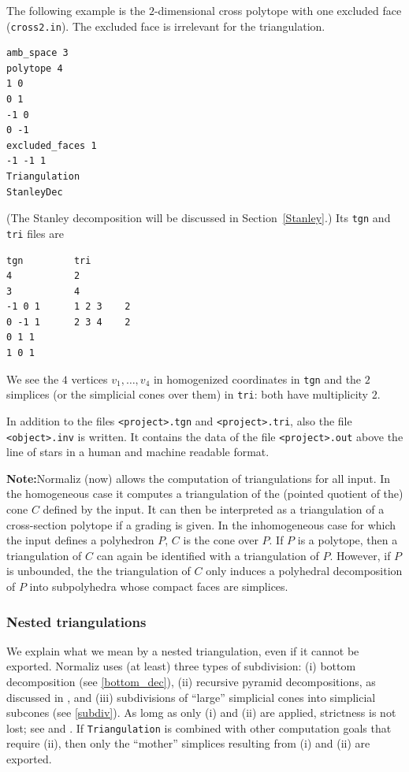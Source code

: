 The following example is the $2$-dimensional cross polytope with one excluded face (\verb|cross2.in|). The excluded face is irrelevant for the triangulation.

\begin{Verbatim}
amb_space 3
polytope 4
1 0
0 1
-1 0
0 -1
excluded_faces 1
-1 -1 1
Triangulation
StanleyDec        
\end{Verbatim}
(The Stanley decomposition will be discussed in Section~\ref{Stanley}.)
Its \verb|tgn| and \verb|tri| files are
\begin{Verbatim}
tgn         tri
4           2
3           4
-1 0 1      1 2 3    2
0 -1 1      2 3 4    2
0 1 1       
1 0 1 
\end{Verbatim}

We see the $4$ vertices $v_1,\dots,v_4$ in homogenized coordinates in \verb|tgn| and the $2$ simplices (or the simplicial cones over them) in \verb|tri|: both have multiplicity $2$.


In addition to the files \verb|<project>.tgn| and \verb|<project>.tri|, also the file \verb|<object>.inv| is written. It contains the data of the file \verb|<project>.out| above the line of stars in a human and machine readable format.

\textbf{Note:}\enspace Normaliz (now) allows the computation of triangulations for all input. In the homogeneous case it computes a triangulation of the (pointed quotient of the) cone $C$ defined by the input. It can then be interpreted as a triangulation of a cross-section polytope if a grading is given. In the inhomogeneous case for which the input defines a polyhedron $P$, $C$ is the cone over $P$. If $P$ is a polytope, then a triangulation of $C$ can again be identified with a triangulation of $P$. However, if $P$ is unbounded, the the triangulation of $C$ only induces a polyhedral decomposition of $P$ into subpolyhedra whose compact faces are simplices.

\subsubsection{Nested triangulations}\label{nested}
We explain what we mean by a nested triangulation, even if it cannot be exported. Normaliz uses (at least) three types of subdivision: (i) bottom decomposition (see \ref{bottom_dec}), (ii) recursive pyramid decompositions, as discussed in \cite{BIS}, and (iii) subdivisions of ``large'' simplicial cones into simplicial subcones (see \ref{subdiv}). As lomg as only (i) and (ii) are applied, strictness is not lost; see \cite{BIS} and \cite{BSS}. If \verb*|Triangulation| is combined with other computation goals that require (ii), then only the ``mother'' simplices resulting from (i) and (ii) are exported. 

